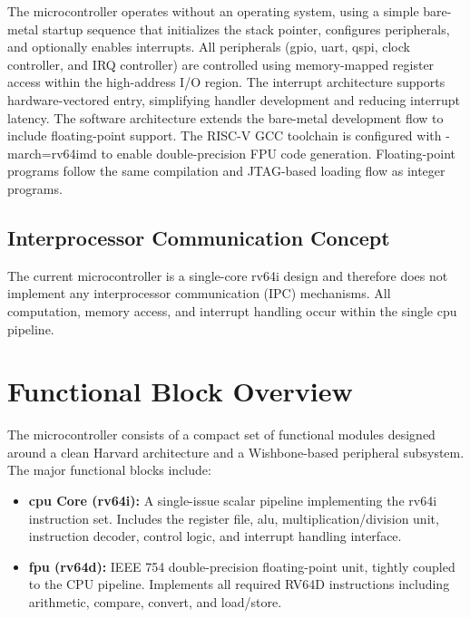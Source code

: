 \begin{itemize}
            The microcontroller operates without an operating system, using a simple
            bare-metal startup sequence that initializes the stack pointer, configures
            peripherals, and optionally enables interrupts. All peripherals (\gls{gpio},
            \gls{uart}, \gls{qspi}, clock controller, and \gls{IRQ} controller) are
            controlled using memory-mapped register access within the high-address I/O
            region. The interrupt architecture supports hardware-vectored entry,
            simplifying handler development and reducing interrupt latency. The software
            architecture extends the bare-metal development flow to include floating-point
            support. The RISC-V GCC toolchain is configured with -march=rv64imd to enable
            double-precision FPU code generation. Floating-point programs follow the same
            compilation and JTAG-based loading flow as integer programs.

            \subsection{Interprocessor Communication Concept}

            The current microcontroller is a single-core \gls{rv64i} design and therefore
            does not implement any interprocessor communication (IPC) mechanisms. All
            computation, memory access, and interrupt handling occur within the single
            \gls{cpu} \gls{pipeline}.

            \section{Functional Block Overview}
            The microcontroller consists of a compact set of functional modules designed
            around a clean \gls{Harvard} architecture and a Wishbone-based peripheral
            subsystem. The major functional blocks include:

            \begin{itemize}
                  \item \textbf{\gls{cpu} Core (\gls{rv64i}):}
                        A single-issue scalar \gls{pipeline} implementing the \gls{rv64i} instruction set. Includes the register
                        file, \gls{alu}, multiplication/division unit, instruction decoder, control logic, and interrupt
                        handling interface.
                  \item \textbf{\gls{fpu} (\gls{rv64d}):}
                        IEEE 754 double-precision floating-point unit, tightly coupled to the CPU pipeline. Implements all required RV64D instructions including arithmetic, compare, convert, and load/store.


\end{itemize}
\end{itemize}
